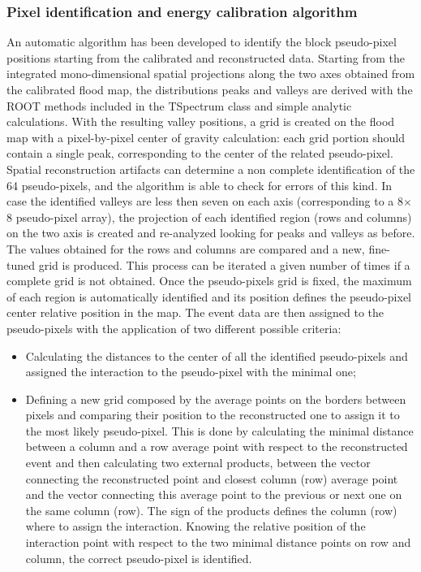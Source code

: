 \subsubsection{Pixel identification and energy calibration algorithm}\label{chap3::subsubsec::absPixel_ID_algo}
An automatic algorithm has been developed to identify the block pseudo-pixel positions starting from the calibrated and reconstructed data. Starting from the integrated mono-dimensional spatial projections along the two axes obtained from the calibrated flood map, the distributions peaks and valleys are derived with the ROOT methods included in the TSpectrum class and simple analytic calculations. With the resulting valley positions, a grid is created on the flood map with a pixel-by-pixel center of gravity calculation: each grid portion should contain a single peak, corresponding to the center of the related pseudo-pixel. Spatial reconstruction artifacts can determine a non complete identification of the 64 pseudo-pixels, and the algorithm is able to check for errors of this kind. In case the identified valleys are less then seven on each axis (corresponding to a 8$\times$8 pseudo-pixel array), the projection of each identified region (rows and columns) on the two axis is created and re-analyzed looking for peaks and valleys as before. The values obtained for the rows and columns are compared and a new, fine-tuned grid is produced. This process can be iterated a given number of times if a complete grid is not obtained. Once the pseudo-pixels grid is fixed, the maximum of each region is automatically identified and its position defines the pseudo-pixel center relative position in the map. The event data are then assigned to the pseudo-pixels with the application of two different possible criteria:
\begin{itemize}
	\item Calculating the distances to the center of all the identified pseudo-pixels and assigned the interaction to the pseudo-pixel with the minimal one;
	\item Defining a new grid composed by the average points on the borders between pixels and comparing their position to the reconstructed one to assign it to the most likely pseudo-pixel. This is done by calculating the minimal distance between a column and a row average point with respect to the reconstructed event and then calculating two external products, between the vector connecting the reconstructed point and closest column (row) average point and the vector connecting this average point to the previous or next one on the same column (row). The sign of the products defines the column (row) where to assign the interaction. 
Knowing the relative position of the interaction point with respect to the two minimal distance points on row and column, the correct pseudo-pixel is identified.    
\end{itemize}

